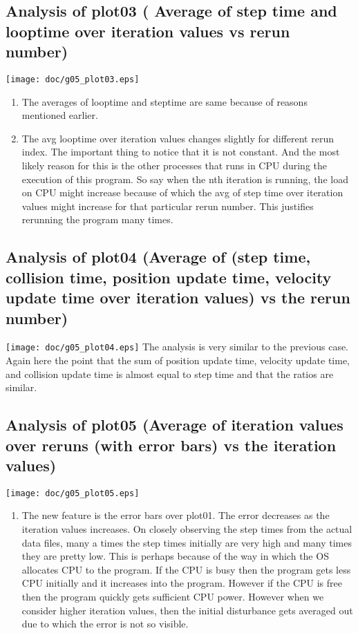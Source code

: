 \documentclass[11pt,english]{article}
\begin{document}
\subsection{
Analysis of plot03 ( Average of step time and looptime over iteration values vs rerun number) }
\texttt{[image: doc/g05\_plot03.eps]}
\begin{enumerate}
\item The averages of looptime and steptime are same because of reasons mentioned earlier.
\item The avg looptime over iteration values changes slightly for different rerun index. The important thing to notice that it is not constant. And the most likely reason for this is the other processes that runs in CPU during the execution of this program. So say when the nth iteration is running, the load on CPU might increase because of which the avg of step time over iteration values might increase for that particular rerun number. This justifies rerunning the program many times.
\end{enumerate}

\subsection{
Analysis of plot04 (Average of (step time, collision time, position update time, velocity update time over iteration values) vs the rerun number) }
\texttt{[image: doc/g05\_plot04.eps]}
The analysis is very similar to the previous case. Again here the point that the sum of position update time, velocity update time, and collision update time is almost equal to step time and that the ratios are similar.


\subsection{
Analysis of plot05 (Average of iteration values over reruns (with error bars) vs the iteration values) }
\texttt{[image: doc/g05\_plot05.eps]}
\begin{enumerate}
\item The new feature is the error bars over plot01. The error decreases as the iteration values increases. On closely observing the step times from the actual data files, many a times the step times initially are very high and many times they are pretty low. This is perhaps because of the way in which the OS allocates CPU to the program. If the CPU is busy then the program gets less CPU initially and it increases into the program. However if the CPU is free then the program quickly gets sufficient CPU power. However when we consider higher iteration values, then the initial disturbance gets averaged out due to which the error is not so visible. 
\end{enumerate}
\end{document}
